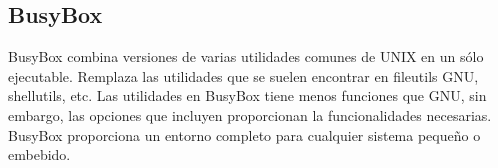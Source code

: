 



				


		\subsection{BusyBox}	
 	
				
			 
BusyBox \cite{Etiqueta36} combina versiones de varias utilidades comunes de UNIX en un sólo ejecutable. Remplaza las utilidades que se suelen encontrar en fileutils GNU, shellutils, etc. Las utilidades en BusyBox tiene menos funciones que GNU, sin embargo, las opciones que incluyen proporcionan la funcionalidades necesarias. BusyBox proporciona un entorno  completo para cualquier sistema pequeño o embebido.

